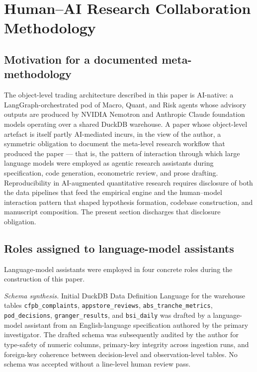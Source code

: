 \documentclass[11pt,letterpaper]{article}
\begin{document}
\section{Human--AI Research Collaboration Methodology}
\label{sec:meta}

\subsection{Motivation for a documented meta-methodology}
The object-level trading architecture described in this paper is
AI-native: a LangGraph-orchestrated pod of Macro, Quant, and Risk
agents whose advisory outputs are produced by NVIDIA Nemotron
and Anthropic Claude foundation models operating over a shared
DuckDB warehouse. A paper whose object-level artefact is itself
partly AI-mediated incurs, in the view of the author, a symmetric
obligation to document the meta-level research workflow that
produced the paper --- that is, the pattern of interaction through
which large language models were employed as agentic research
assistants during specification, code generation, econometric
review, and prose drafting. Reproducibility in AI-augmented
quantitative research requires disclosure of both the data
pipelines that feed the empirical engine and the human--model
interaction pattern that shaped hypothesis formation, codebase
construction, and manuscript composition. The present section
discharges that disclosure obligation.

\subsection{Roles assigned to language-model assistants}
Language-model assistants were employed in four concrete roles
during the construction of this paper.

{\sloppy
\emph{Schema synthesis.} Initial DuckDB Data Definition Language
for the warehouse tables \texttt{cfpb\_complaints},
\texttt{appstore\_reviews}, \texttt{abs\_tranche\_metrics},
\texttt{pod\_decisions}, \texttt{granger\_results}, and
\texttt{bsi\_daily} was drafted by a language-model assistant
from an English-language specification authored by the primary
investigator. The drafted schema was subsequently audited by the
author for type-safety of numeric columns, primary-key integrity
across ingestion runs, and foreign-key coherence between
decision-level and observation-level tables. No schema was
accepted without a line-level human review pass.
\par}
\end{document}
